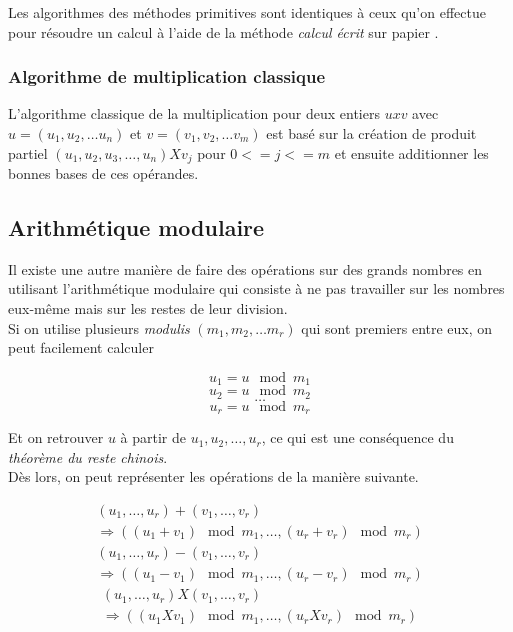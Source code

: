\documentclass[letterpaper]{article}
\begin{document}
Les algorithmes des méthodes primitives sont identiques à ceux qu'on effectue
pour résoudre un calcul à l'aide de la méthode \emph{calcul écrit} sur papier
\cite{knuth1997aocp}.

\subsubsection{Algorithme de multiplication classique}

L'algorithme classique de la multiplication pour deux entiers $u x v$ avec
$u = (u_1, u_2, \dots u_n)$ et $v = (v_1, v_2, \dots v_m)$ est basé sur la
création de produit partiel $(u_1, u_2, u_3, \dots, u_n) X v_j$ pour
$0 <= j <= m$  et ensuite additionner les bonnes bases de ces opérandes.


\subsection{Arithmétique modulaire}

Il existe une autre manière de faire des opérations sur des grands nombres
en utilisant l'arithmétique modulaire qui consiste à ne pas travailler sur les
nombres eux-même mais sur les restes de leur division\cite{wikiamodulaire}.\\

Si on utilise plusieurs \emph{modulis} $(m_1, m_2, \dots m_r)$ qui sont
premiers entre eux, on peut facilement calculer

  $$u_1 = u \mod m_1$$
  $$u_2 = u \mod m_2$$
  $$\dots$$
  $$u_r = u \mod m_r$$

Et on retrouver $u$ à partir de $u_1, u_2, \dots, u_r$, ce qui
est une conséquence du \emph{théorème du reste chinois}.\\

Dès lors, on peut représenter les opérations de la manière suivante.

\begin{equation}
  \begin{split}
    (u_1, \dots, u_r) + (v_1, \dots, v_r) \\
     \Rightarrow ((u_1 + v_1) \mod m_1, \dots, (u_r + v_r) \mod m_r)
  \end{split}
\end{equation}
\begin{equation}
  \begin{split}
    (u_1, \dots, u_r) - (v_1, \dots, v_r) \\
      \Rightarrow ((u_1 - v_1) \mod m_1, \dots, (u_r - v_r) \mod m_r)
  \end{split}
\end{equation}
\begin{equation}
  \begin{split}
    (u_1, \dots, u_r) X (v_1, \dots, v_r) \\
      \Rightarrow ((u_1 X v_1) \mod m_1, \dots, (u_r X v_r) \mod m_r)
  \end{split}
\end{equation}
\end{document}
